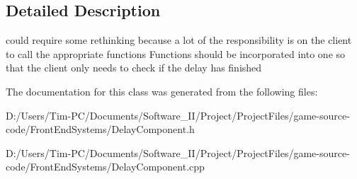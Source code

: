 \subsection{Detailed Description}
could require some rethinking because a lot of the responsibility is on the client to call the appropriate functions Functions should be incorporated into one so that the client only needs to check if the delay has finished 

The documentation for this class was generated from the following files\+:\begin{DoxyCompactItemize}
\item 
D\+:/\+Users/\+Tim-\/\+P\+C/\+Documents/\+Software\+\_\+\+I\+I/\+Project/\+Project\+Files/game-\/source-\/code/\+Front\+End\+Systems/Delay\+Component.\+h\item 
D\+:/\+Users/\+Tim-\/\+P\+C/\+Documents/\+Software\+\_\+\+I\+I/\+Project/\+Project\+Files/game-\/source-\/code/\+Front\+End\+Systems/Delay\+Component.\+cpp\end{DoxyCompactItemize}
